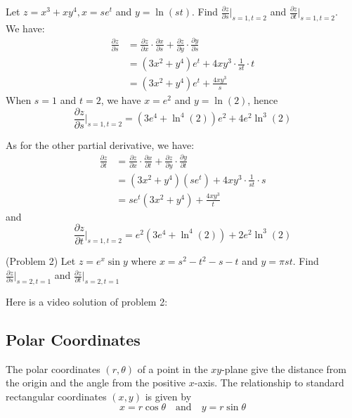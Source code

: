 \documentclass[handout]{ximera}
\begin{document}
\begin{example}[Example 2]
Let $z = x^3 + xy^4, x = se^t$ and $y = \ln(st)$. 
Find $\frac{\partial z}{\partial s}\bigg|_{s = 1, t = 2}$ 
and $\frac{\partial z}{\partial t}\bigg|_{s = 1, t = 2}$.\\



We have:
\begin{align*}
\frac{\partial z}{\partial s} &= \frac{\partial z}{\partial x} \cdot \frac{\partial x}{\partial s} + \frac{\partial z}{\partial y} \cdot \frac{\partial y}{\partial s}\\
                              &= (3x^2 + y^4)e^t + 4xy^3\cdot\frac{1}{st} \cdot t\\
                              &= (3x^2 + y^4)e^t + \frac{4xy^3}{s}
\end{align*}
When $s = 1$ and $t = 2$, we have $x = e^2$ and $y = \ln(2)$, hence
\[
\frac{\partial z}{\partial s}\bigg|_{s = 1, t = 2} = (3e^4 + \ln^4(2))e^2 + 4e^2 \ln^3(2)
\]

As for the other partial derivative, we have:
\begin{align*}
\frac{\partial z}{\partial t} &= \frac{\partial z}{\partial x} \cdot \frac{\partial x}{\partial t} + \frac{\partial z}{\partial y} \cdot \frac{\partial y}{\partial t}\\
                              &= (3x^2 + y^4)(se^t) + 4xy^3\cdot\frac{1}{st} \cdot s\\
                              &= se^t(3x^2 + y^4) + \frac{4xy^3}{t}
\end{align*}
and
\[
\frac{\partial z}{\partial t}\bigg|_{s = 1, t = 2} = e^2(3e^4 + \ln^4(2)) + 2e^2 \ln^3(2)
\]

\end{example}



\begin{problem}(Problem 2)
Let $z = e^x \sin y$ where $x = s^2 - t^2 - s - t$ and $y = \pi st$. 
Find $\frac{\partial z}{\partial s}\bigg|_{s = 2, t = 1}$ 
and $\frac{\partial z}{\partial t}\bigg|_{s = 2, t = 1}$
\end{problem}

Here is a video solution of problem 2:\\
\begin{foldable}
\end{foldable}

\subsection{Polar Coordinates}
The polar coordinates $(r, \theta)$ of a point in the $xy$-plane give 
the distance from the origin and the angle from the positive $x$-axis. 
The relationship to standard rectangular coordinates $(x,y)$ is given by
\[
x = r \cos \theta \quad \text{and} \quad y = r \sin \theta
\]
\end{document}
